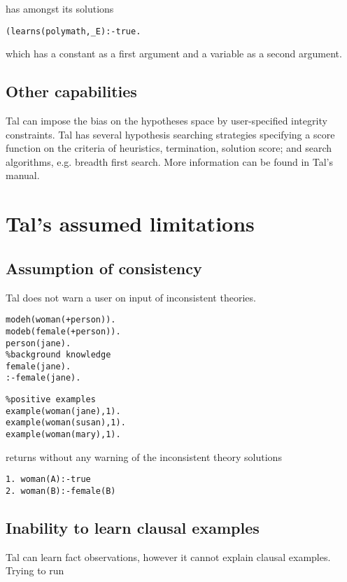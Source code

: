 has amongst its solutions
\begin{lstlisting}
(learns(polymath,_E):-true.
\end{lstlisting}
which has a constant  as a first argument and a variable as a second argument.
\subsection{Other capabilities}
Tal can impose the bias on the hypotheses space by user-specified integrity constraints. Tal has several hypothesis searching strategies specifying a score function on the criteria of heuristics, termination, solution score; and search algorithms, e.g. breadth first search. More information can be found in Tal's manual.

\section{Tal's assumed limitations}

\subsection{Assumption of consistency}\label{tal_consistency_assumption}
Tal does not warn a user on input of inconsistent theories.

\begin{minipage}[t]{.50\textwidth}
\begin{lstlisting}
modeh(woman(+person)).
modeb(female(+person)).
person(jane).
%background knowledge
female(jane).
:-female(jane).
\end{lstlisting}
\end{minipage}
\begin{minipage}[t]{.20\textwidth}
\begin{lstlisting}
%positive examples
example(woman(jane),1).
example(woman(susan),1).
example(woman(mary),1).
\end{lstlisting}
\end{minipage}

returns without any warning of the inconsistent theory solutions
\begin{lstlisting}
1. woman(A):-true
2. woman(B):-female(B)
\end{lstlisting}

\subsection{Inability to learn clausal examples}\label{tal_clausal_examples}
Tal can learn fact observations, however it cannot explain clausal examples.
Trying to run

